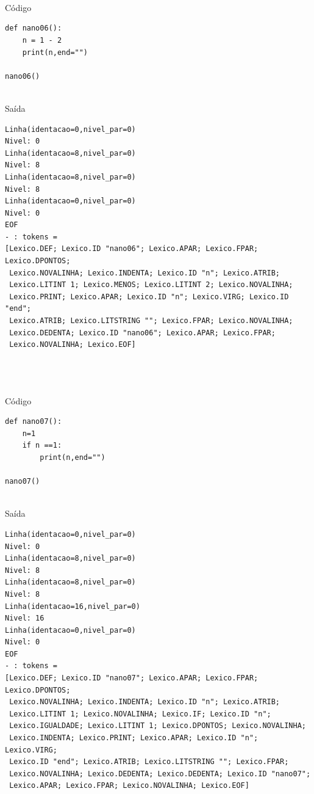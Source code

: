 \documentclass{article}
\begin{document}
\\\\\\Código
\begin{lstlisting}
def nano06():
	n = 1 - 2 
	print(n,end="")

nano06()
\end{lstlisting}

\\Saída
\begin{lstlisting}
Linha(identacao=0,nivel_par=0)
Nivel: 0
Linha(identacao=8,nivel_par=0)
Nivel: 8
Linha(identacao=8,nivel_par=0)
Nivel: 8
Linha(identacao=0,nivel_par=0)
Nivel: 0
EOF
- : tokens =
[Lexico.DEF; Lexico.ID "nano06"; Lexico.APAR; Lexico.FPAR; Lexico.DPONTOS;
 Lexico.NOVALINHA; Lexico.INDENTA; Lexico.ID "n"; Lexico.ATRIB;
 Lexico.LITINT 1; Lexico.MENOS; Lexico.LITINT 2; Lexico.NOVALINHA;
 Lexico.PRINT; Lexico.APAR; Lexico.ID "n"; Lexico.VIRG; Lexico.ID "end";
 Lexico.ATRIB; Lexico.LITSTRING ""; Lexico.FPAR; Lexico.NOVALINHA;
 Lexico.DEDENTA; Lexico.ID "nano06"; Lexico.APAR; Lexico.FPAR;
 Lexico.NOVALINHA; Lexico.EOF]
\end{lstlisting}


\\\\\\Código
\begin{lstlisting}
def nano07():
	n=1
	if n ==1:
		print(n,end="")

nano07()
\end{lstlisting}

\\Saída
\begin{lstlisting}
Linha(identacao=0,nivel_par=0)
Nivel: 0
Linha(identacao=8,nivel_par=0)
Nivel: 8
Linha(identacao=8,nivel_par=0)
Nivel: 8
Linha(identacao=16,nivel_par=0)
Nivel: 16
Linha(identacao=0,nivel_par=0)
Nivel: 0
EOF
- : tokens =
[Lexico.DEF; Lexico.ID "nano07"; Lexico.APAR; Lexico.FPAR; Lexico.DPONTOS;
 Lexico.NOVALINHA; Lexico.INDENTA; Lexico.ID "n"; Lexico.ATRIB;
 Lexico.LITINT 1; Lexico.NOVALINHA; Lexico.IF; Lexico.ID "n";
 Lexico.IGUALDADE; Lexico.LITINT 1; Lexico.DPONTOS; Lexico.NOVALINHA;
 Lexico.INDENTA; Lexico.PRINT; Lexico.APAR; Lexico.ID "n"; Lexico.VIRG;
 Lexico.ID "end"; Lexico.ATRIB; Lexico.LITSTRING ""; Lexico.FPAR;
 Lexico.NOVALINHA; Lexico.DEDENTA; Lexico.DEDENTA; Lexico.ID "nano07";
 Lexico.APAR; Lexico.FPAR; Lexico.NOVALINHA; Lexico.EOF]
\end{lstlisting}
\end{document}
